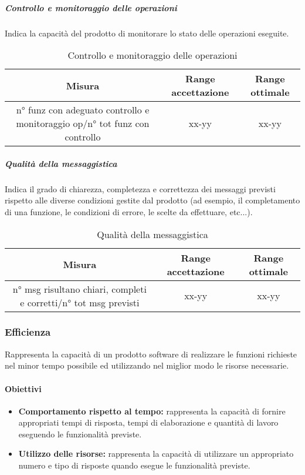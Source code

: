 			\subparagraph{Controllo e monitoraggio delle operazioni}
			Indica la capacità del prodotto di monitorare lo stato delle operazioni eseguite.
			\begin{table}[H]
				\begin{center}
					\begin{tabular}{|c|c|c|}
						\hline
						\textbf{Misura} & \textbf{Range accettazione} & \textbf{Range ottimale} \\
						\hline
						n° funz con adeguato controllo e monitoraggio op/n° tot funz con controllo & xx-yy  & xx-yy \\
						\hline
					\end{tabular}
				\end{center}
				\caption{Controllo e monitoraggio delle operazioni}
			\end{table}
			
			\subparagraph{Qualità della messaggistica}
			Indica il grado di chiarezza, completezza e correttezza dei messaggi previsti rispetto alle diverse condizioni gestite dal prodotto (ad esempio, il completamento di una funzione, le condizioni di errore, le scelte da effettuare, etc...).
			\begin{table}[H]
				\begin{center}
					\begin{tabular}{|c|c|c|}
						\hline
						\textbf{Misura} & \textbf{Range accettazione} & \textbf{Range ottimale} \\
						\hline
						n° msg risultano chiari, completi e corretti/n° tot msg previsti & xx-yy  & xx-yy \\
						\hline
					\end{tabular}
				\end{center}
				\caption{Qualità della messaggistica}
			\end{table}
	
	\subsubsection{Efficienza}
	Rappresenta la capacità di un prodotto software di realizzare le funzioni richieste nel minor tempo possibile ed utilizzando nel miglior modo le risorse necessarie.
		
		\paragraph{Obiettivi}
			\begin{itemize}
				\item \textbf{Comportamento rispetto al tempo:} rappresenta la capacità di fornire appropriati tempi di risposta, tempi di elaborazione e quantità di lavoro eseguendo le funzionalità previste.
				\item \textbf{Utilizzo delle risorse:} rappresenta la capacità di utilizzare un appropriato numero e tipo di risposte quando esegue le funzionalità previste.
			\end{itemize}
		
